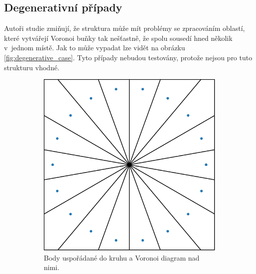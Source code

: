 \subsection*{Degenerativní případy}
Autoři studie zmiňují, že struktura může mít problémy se zpracováním oblastí, které vytvářejí Voronoi buňky tak nešťastně, že spolu sousedí hned několik v~jednom místě. Jak to může vypadat lze vidět na obrázku \ref{fig:degenerative_case}. Tyto případy nebudou testovány, protože nejsou pro tuto strukturu vhodné.




\begin{figure}
\centering
\begin{subfigure}[t]{0.4\columnwidth}
    \centering
    \includegraphics[scale=0.45]{obrazky-figures/testing/circletest.pdf}
    \caption{Body uspořádané do kruhu a Voronoi diagram nad nimi.}
\end{subfigure}
\hfill
\begin{subfigure}[t]{0.45\columnwidth}
    \centering

\end{subfigure}
\end{figure}

